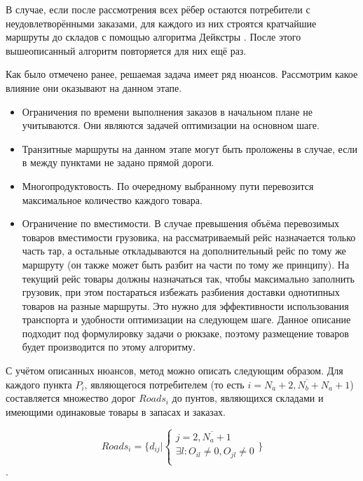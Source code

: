 	В случае, если после рассмотрения всех рёбер остаются потребители с неудовлетворёнными заказами, для каждого из них строятся кратчайшие маршруты до складов с помощью алгоритма Дейкстры \cite{alg:Corman}. После этого вышеописанный алгоритм повторяется для них ещё раз.
	
	Как было отмечено ранее, решаемая задача имеет ряд нюансов. Рассмотрим какое влияние они оказывают на данном этапе.
	\begin{itemize}
		\item Ограничения по времени выполнения заказов в начальном плане не учитываются. Они являются задачей оптимизации на основном шаге.
		\item Транзитные маршруты на данном этапе могут быть проложены в случае, если в между пунктами не задано прямой дороги.
		\item Многопродуктовость\cite{trans:polyprod}. По очередному выбранному пути перевозится максимальное количество каждого товара. 
		\item Ограничение по вместимости. В случае превышения объёма перевозимых товаров вместимости грузовика, на рассматриваемый рейс назначается только часть тар, а остальные откладываются на дополнительный рейс по тому же маршруту (он также может быть разбит на части по тому же принципу). На текущий рейс товары должны назначаться так, чтобы максимально заполнить грузовик, при этом постараться избежать разбиения доставки однотипных товаров на разные маршруты. Это нужно для эффективности использования транспорта и удобности оптимизации на следующем шаге. Данное описание подходит под формулировку задачи о рюкзаке\cite{alg:Skiena}, поэтому размещение товаров будет производится по этому алгоритму.
	\end{itemize}
	
	С учётом описанных нюансов, метод можно описать следующим образом. Для каждого пункта $P_i$, являющегося потребителем (то есть $i = \overline{N_a+2, N_b+N_a+1}$) составляется множество дорог $Roads_i$ до пунтов, являющихся складами и имеющими одинаковые товары в запасах и заказах. 
	
	\begin{equation}
		Roads_i = \{
			d_{ij} 
			| 
			\left\{ \begin{array}{ccc}	
				j = \overline{2, N_a + 1} \\
				\exists l: O_{il} \ne 0, O_{jl} \ne 0\\
			\end{array}	\right.
		\}
	\end{equation}.

